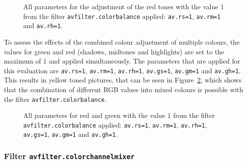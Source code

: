 \documentclass[../MasterThesis.tex]{subfiles}
\begin{document}
\begin{figure}[H]
	\begin{center}
		\caption[Parameters set to $1$ for red using the \texttt{avfilter.colorbalance} filter.]{All parameters for the adjustment of the red tones with the value $1$ from the filter \texttt{avfilter.colorbalance} applied: \texttt{av.rs=1}, \texttt{av.rm=1} and \texttt{av.rh=1}.}
		\label{figure:rsrmrh1}
	\end{center}
\end{figure}

To assess the effects of the combined colour adjustment of multiple colours, the values for green and red (shadows, midtones and highlights) are set to the maximum of $1$ and applied simultaneously. The parameters that are applied for this evaluation are \texttt{av.rs=1}, \texttt{av.rm=1}, \texttt{av.rh=1}, \texttt{av.gs=1}, \texttt{av.gm=1} and \texttt{av.gh=1}.
This results in yellow toned pictures, that can be seen in Figure~\ref{figure:cb_yellow}, which shows that the combination of different RGB values into mixed colours is possible with the filter \texttt{avfilter.colorbalance}.


\begin{figure}[H]
	\begin{center}
		\caption[Red and green parameters set to $1$ with \texttt{avfilter.colorbalance}.]{All parameters for red and green with the value $1$ from the filter \texttt{avfilter.colorbalance} applied: \texttt{av.rs=1}, \texttt{av.rm=1}, \texttt{av.rh=1}, \texttt{av.gs=1}, \texttt{av.gm=1} and \texttt{av.gh=1}.}
		\label{figure:cb_yellow}
	\end{center}
\end{figure}














\subsubsection*{Filter \texttt{avfilter.colorchannelmixer}}
\end{document}
